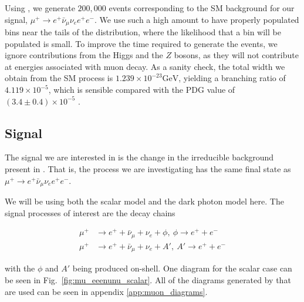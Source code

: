 Using \madgraph, we generate $200,000$ events corresponding to the SM background for our signal, $\mu^+ \rightarrow e^+ \bar{\nu}_\mu \nu_e e^+ e^-$.
We use such a high amount to have properly populated bins near the tails of the distribution, where the likelihood that a bin will be populated is small.
To improve the time required to generate the events, we ignore contributions from the Higgs and the $Z$ bosons, as they will not contribute at energies associated with muon decay.
As a sanity check, the total width we obtain from the SM process is $1.239\times 10^{-23}\textrm{GeV}$, yielding a branching ratio of $4.119\times 10^{-5}$, which is sensible compared with the PDG value of $(3.4 \pm 0.4) \times 10^{-5}$ \cite{Agashe:2014kda}.

\subsection{Signal}
The signal we are interested in is the change in the irreducible background present in \mueee.
That is, the process we are investigating has the same final state as $\mu^+ \rightarrow e^+ \bar{\nu}_\mu \nu_e e^+ e^-$.

We will be using both the scalar model and the dark photon model here.
The signal processes of interest are the decay chains

\begin{align}
    \mu^+ & \rightarrow e^+ + \bar{\nu}_\mu + \nu_e + \phi,~\phi \rightarrow e^+ + e^- \\
    \mu^+ & \rightarrow e^+ + \bar{\nu}_\mu + \nu_e + A',~A' \rightarrow e^+ + e^-
\end{align}

\noindent with the $\phi$ and $A'$ being produced on-shell.
One diagram for the scalar case can be seen in Fig.\ \ref{fig:mu_eeenunu_scalar}.
All of the diagrams generated by \madgraph that are used can be seen in appendix \ref{app:muon_diagrams}.

